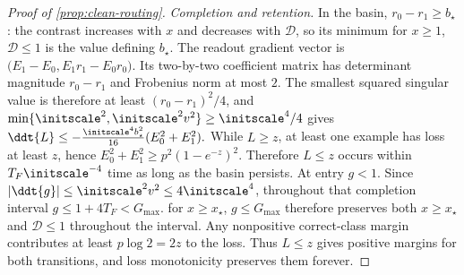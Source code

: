 \begin{proof}[Proof of \cref{prop:clean-routing}]
\emph{Completion and retention.}
In the basin, $r_0-r_1\ge b_\star$: the contrast increases with $x$ and decreases with $\mathcal D$, so its minimum for $x\ge1$, $\mathcal D\le1$
is the value defining $b_\star$. The readout gradient vector is
$\bigl(E_1-E_0,E_1r_1-E_0r_0\bigr)$.
Its two-by-two coefficient matrix has determinant magnitude $r_0-r_1$ and Frobenius norm at most $2$.
The smallest squared singular value is therefore at least $(r_0-r_1)^2/4$, and
$\min\{\initscale^2,\initscale^2v^2\}\ge\initscale^4/4$ gives
 $\ddt{L}\le-\frac{\initscale^4b_\star^2}{16}(E_0^2+E_1^2).$ 
While $L\ge z$, at least one example has loss at least $z$, hence
$E_0^2+E_1^2\ge p^2(1-e^{-z})^2$. Therefore $L\le z$ occurs within $T_F\initscale^{-4}$ time as long as the basin persists.
At entry $g<1$. Since $|\ddt{g}|\le\initscale^2v^2\le4\initscale^4$, throughout that completion interval
$g\le1+4T_F<G_{\max}$.  for $x\ge x_\star$, $g\le G_{\max}$ therefore preserves both $x\ge x_\star$ and $\mathcal D\le1$ throughout the interval.
Any nonpositive correct-class margin contributes at least $p\log2=2z$ to the loss. Thus $L\le z$ gives positive margins for both transitions, and loss monotonicity preserves them forever.
\end{proof}


